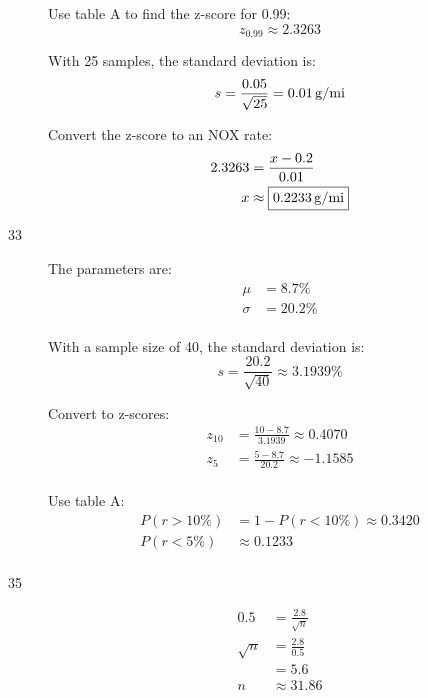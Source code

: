 \documentclass[letterpaper, landscape]{exam}
\begin{document}
\begin{description}
        Use table A to find the z-score for 0.99:
        \[
          z_{0.99} \approx 2.3263
        \]

        With 25 samples, the standard deviation is:
        \[
          s = \frac{0.05}{\sqrt{25}} = \unit[0.01]{g/mi}
        \]

        Convert the z-score to an NOX rate:
        \begin{align*}
          2.3263 & = \frac{x - 0.2}{0.01} \\
          x     & \approx \boxed{ \unit[0.2233]{g/mi} } \\
        \end{align*}

      \item[33]
        The parameters are:
        \begin{align*}
          \mu    & = 8.7\% \\
          \sigma & = 20.2\% \\
        \end{align*}

        With a sample size of 40, the standard deviation is:
        \[
          s = \frac{20.2}{\sqrt{40}} \approx 3.1939\%
        \]

        Convert to z-scores:
        \begin{align*}
          z_{10} & = \frac{10 - 8.7}{3.1939} \approx 0.4070 \\
          z_{5}  & = \frac{5 - 8.7}{20.2} \approx -1.1585 \\
        \end{align*}

        Use table A:
        \begin{align*}
          P(r > 10\%) & = 1 - P(r < 10\%) \approx \boxed{ 0.3420 } \\
          P(r < 5\%)  & \approx \boxed{ 0.1233 } \\
        \end{align*}

      \item[35]
        \begin{align*}
          0.5      & = \frac{2.8}{\sqrt{n}} \\
          \sqrt{n} & = \frac{2.8}{0.5} \\
                   & = 5.6 \\
          n        & \approx 31.86 \\
        \end{align*}


\end{description}
\end{document}
